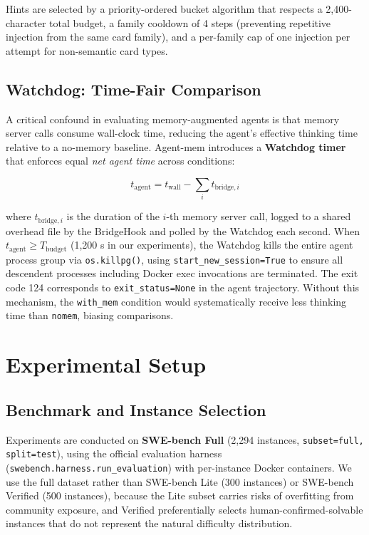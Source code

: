 \documentclass{article}
\begin{document}
Hints are selected by a priority-ordered bucket algorithm that respects a 2,400-character total budget, a family cooldown of 4 steps (preventing repetitive injection from the same card family), and a per-family cap of one injection per attempt for non-semantic card types.

\subsection{Watchdog: Time-Fair Comparison}

A critical confound in evaluating memory-augmented agents is that memory server calls consume wall-clock time, reducing the agent's effective thinking time relative to a no-memory baseline. Agent-mem introduces a \textbf{Watchdog timer} that enforces equal \emph{net agent time} across conditions:

\begin{equation}
t_{\text{agent}} = t_{\text{wall}} - \sum_i t_{\text{bridge},i}
\end{equation}

where $t_{\text{bridge},i}$ is the duration of the $i$-th memory server call, logged to a shared overhead file by the BridgeHook and polled by the Watchdog each second. When $t_{\text{agent}} \geq T_{\text{budget}}$ (1,200 s in our experiments), the Watchdog kills the entire agent process group via \texttt{os.killpg()}, using \texttt{start\_new\_session=True} to ensure all descendent processes including Docker exec invocations are terminated. The exit code 124 corresponds to \texttt{exit\_status=None} in the agent trajectory. Without this mechanism, the \texttt{with\_mem} condition would systematically receive less thinking time than \texttt{nomem}, biasing comparisons.

\section{Experimental Setup}

\subsection{Benchmark and Instance Selection}

Experiments are conducted on \textbf{SWE-bench Full} (2,294 instances, \texttt{subset=full, split=test}), using the official evaluation harness (\texttt{swebench.harness.run\_evaluation}) with per-instance Docker containers. We use the full dataset rather than SWE-bench Lite (300 instances) or SWE-bench Verified (500 instances), because the Lite subset carries risks of overfitting from community exposure, and Verified preferentially selects human-confirmed-solvable instances that do not represent the natural difficulty distribution.
\end{document}
